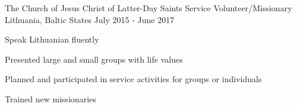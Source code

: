 

\begin{cventries}

  \cventry
    {The Church of Jesus Christ of Latter-Day Saints} %
    {Service Volunteer/Missionary} %
    {Lithuania, Baltic States} %
    {July 2015 - June 2017} %
    {
      \begin{cvitems} %
        \item {Speak Lithuanian fluently}
        \item {Presented large and small groups with life values}
        \item {Planned and participated in service activities for groups or individuals}
        \item {Trained new missionaries}
      \end{cvitems}
    }



\end{cventries}
